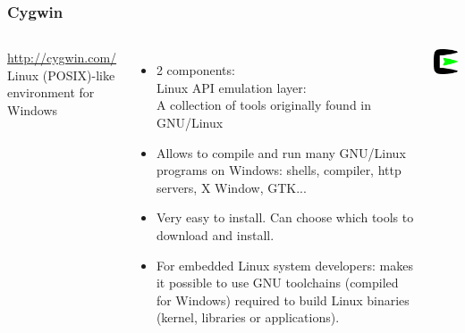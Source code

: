 \begin{frame}
  \frametitle{Cygwin}
  \begin{columns}[T]
    \url{http://cygwin.com/}\\
    Linux (POSIX)-like environment for Windows
    \begin{itemize}
    \item 2 components:\\
      Linux API emulation layer: \\
      A collection of tools originally found in GNU/Linux
    \item Allows to compile and run many GNU/Linux programs on Windows: shells,
      compiler, http servers, X Window, GTK...
    \item Very easy to install. Can choose which tools to download and
      install.
    \item For embedded Linux system developers: makes it possible to use
      GNU toolchains (compiled for Windows) required to build Linux
      binaries (kernel, libraries or applications).
    \end{itemize}
    \includegraphics[width=\textwidth]{slides/sysdev-application-development/cygwin.png}
  \end{columns}
\end{frame}

